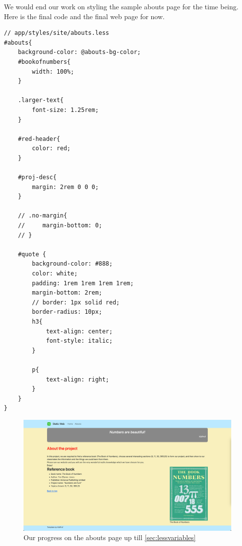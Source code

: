 We would end our work on styling the sample abouts page for the time being. Here is the final code and the final web page for now.

\begin{lstlisting}[language=pug]
// app/styles/site/abouts.less
#abouts{
    background-color: @abouts-bg-color;
    #bookofnumbers{
        width: 100%;
    }
    
    .larger-text{
        font-size: 1.25rem;
    }
    
    #red-header{
        color: red;
    }
    
    #proj-desc{
        margin: 2rem 0 0 0;
    }
    
    // .no-margin{
    //     margin-bottom: 0;
    // }
    
    #quote {
        background-color: #888;
        color: white;
        padding: 1rem 1rem 1rem 1rem;
        margin-bottom: 2rem;
        // border: 1px solid red;
        border-radius: 10px;
        h3{
            text-align: center;
            font-style: italic;
        }
        
        p{
            text-align: right;
        }
    }
}
\end{lstlisting}

\begin{figure}[h]
\centering
\includegraphics[width=13cm]{images/chn6-background-colour.png}
\caption{Our progress on the abouts page up till \cref{sec:lessvariables}}
\label{fig:aboutsfinal}
\end{figure}